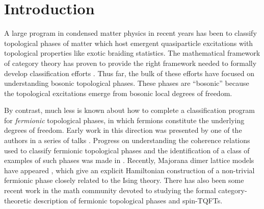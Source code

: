 
\section{Introduction}


A large program in condensed matter physics in recent years has been to classify 
topological phases of matter which host emergent quasiparticle excitations 
with topological properties like exotic braiding statistics. 
The mathematical framework of category theory has proven to provide the right 
framework needed to formally develop classification efforts \cite{kitaev2006}. 
Thus far, the bulk of these efforts have focused on understanding bosonic topological phases.
These phases are ``bosonic'' because the topological excitations emerge from bosonic 
local degrees of freedom.

By contrast, much less is known about how to complete a classification program for {\it fermionic} topological phases, in which fermions constitute 
the underlying degrees of freedom. 
Early work in this direction was presented by one of the authors in a series of talks \cite{Walker2013,Walker2014,Walker2015}.
Progress on understanding the coherence relations used to classify fermionic topological phases and the identification of a class of examples of such phases was made in \cite{gu2015,gu2014,Lan2016b}. 
Recently, Majorana dimer lattice models have appeared \cite{tarantino2016,ware2016}, 
which give an explicit Hamiltonian construction of a 
non-trivial fermionic phase closely related to the Ising theory. 
There has also been some recent work in the math community \cite{usher2016,brundan2016,bruillard2017,bonderson2017} 
devoted to studying the formal category-theoretic description of fermionic topological phases and spin-TQFTs. 

